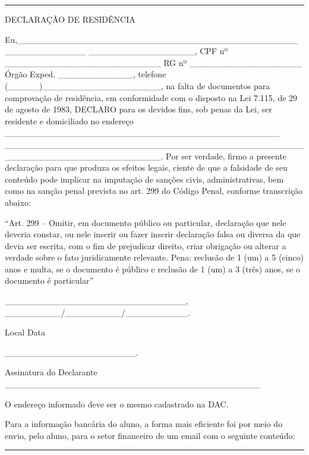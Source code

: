 \documentclass[
  letterpaper,
  DIV=11,
  numbers=noendperiod]{scrreprt}
\begin{document}
\begin{center}\rule{0.5\linewidth}{0.5pt}\end{center}

DECLARAÇÃO DE RESIDÊNCIA

Eu,\_\_\_\_\_\_\_\_\_\_\_\_\_\_\_\_\_\_\_\_\_\_\_\_\_\_\_\_\_\_\_\_\_\_\_\_\_\_\_\_\_\_\_\_\_\_\_\_\_\_\_\_\_\_\_\_\_\_
\_\_\_\_\_\_\_\_\_\_\_\_\_\_\_\_\_, CPF nº
\_\_\_\_\_\_\_\_\_\_\_\_\_\_\_\_\_\_\_\_\_\_\_\_\_ RG nº
\_\_\_\_\_\_\_\_\_\_\_\_\_\_\_\_\_\_ Órgão Exped.
\_\_\_\_\_\_\_\_\_\_\_\_, telefone
(\_\_\_\_\_)\_\_\_\_\_\_\_\_\_\_\_\_\_\_\_\_\_\_\_, na falta de
documentos para comprovação de residência, em conformidade com o
disposto na Lei 7.115, de 29 de agosto de 1983, DECLARO para os devidos
fins, sob penas da Lei, ser residente e domiciliado no endereço
\_\_\_\_\_\_\_\_\_\_\_\_\_\_\_\_\_\_\_\_\_\_\_\_\_\_\_\_\_\_\_\_\_\_\_\_\_\_\_\_\_\_\_\_
\_\_\_\_\_\_\_\_\_\_\_\_\_\_\_\_\_\_\_\_\_\_\_\_\_\_\_\_\_\_\_\_\_\_\_\_\_\_\_\_\_\_\_\_\_\_\_\_\_\_\_\_\_\_\_\_\_\_\_\_\_\_\_\_\_\_\_\_\_\_\_\_\_.
Por ser verdade, firmo a presente declaração para que produza os efeitos
legais, ciente de que a falsidade de seu conteúdo pode implicar na
imputação de sanções civis, administrativas, bem como na sanção penal
prevista no art. 299 do Código Penal, conforme transcrição abaixo:

``Art. 299 -- Omitir, em documento público ou particular, declaração que
nele deveria constar, ou nele inserir ou fazer inserir declaração falsa
ou diversa da que devia ser escrita, com o fim de prejudicar direito,
criar obrigação ou alterar a verdade sobre o fato juridicamente
relevante. Pena: reclusão de 1 (um) a 5 (cinco) anos e multa, se o
documento é público e reclusão de 1 (um) a 3 (três) anos, se o documento
é particular''

\_\_\_\_\_\_\_\_\_\_\_\_\_\_\_\_\_\_\_\_\_\_\_\_\_\_\_\_\_,
\_\_\_\_\_\_\_\_\_/\_\_\_\_\_\_\_\_\_/\_\_\_\_\_\_\_\_\_\_.

Local Data

\_\_\_\_\_\_\_\_\_\_\_\_\_\_\_\_\_\_\_\_\_.

Assinatura do Declarante
\_\_\_\_\_\_\_\_\_\_\_\_\_\_\_\_\_\_\_\_\_\_\_\_\_\_\_\_\_\_\_\_\_\_\_\_\_\_\_\_\_

O endereço informado deve ser o mesmo cadastrado na DAC.

Para a informação bancária do aluno, a forma mais eficiente foi por meio
do envio, pelo aluno, para o setor financeiro de um email com o seguinte
conteúdo:

\begin{center}\rule{0.5\linewidth}{0.5pt}\end{center}
\end{document}
